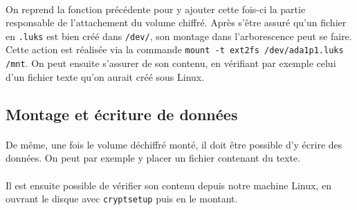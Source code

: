 \paragraph{}
On reprend la fonction précédente pour y ajouter cette fois-ci la partie
responsable de l'attachement du volume chiffré. Après s'être assuré qu'un
fichier en \texttt{.luks} est bien créé dans \texttt{/dev/}, son montage dans
l'arborescence peut se faire. Cette action est réalisée via la commande
\texttt{mount -t ext2fs /dev/ada1p1.luks /mnt}. On peut ensuite s'assurer de son
contenu, en vérifiant par exemple celui d'un fichier texte qu'on aurait créé
sous Linux.

\subsection{Montage et écriture de données}
\paragraph{}
De même, une fois le volume déchiffré monté, il doit être possible d'y écrire
des données. On peut par exemple y placer un fichier contenant du texte.
\paragraph{}
Il est ensuite possible de vérifier son contenu depuis notre machine Linux, en
ouvrant le disque avec \texttt{cryptsetup} puis en le montant.